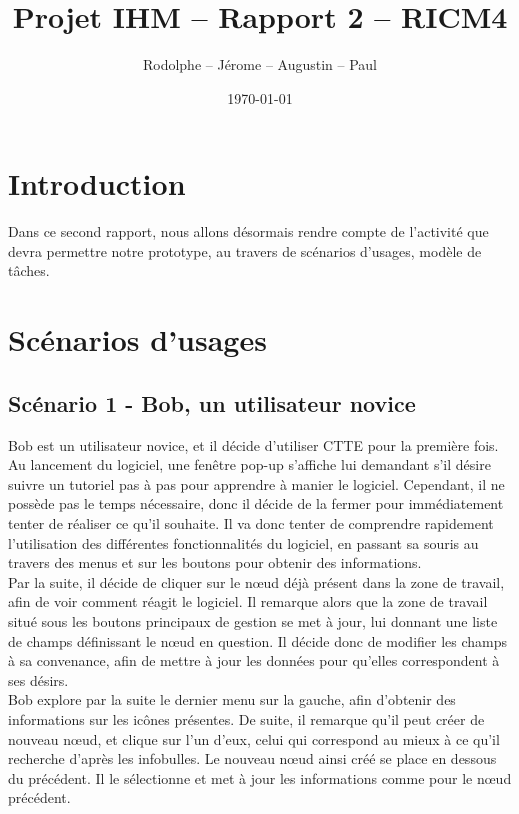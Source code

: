 \documentclass[12pt, a4paper]{article}
\title{Projet IHM -- Rapport 2 -- RICM4}
\author{\bsc{Fréby} Rodolphe -- \bsc{Barbier} Jérome -- \bsc{Husson} Augustin -- \bsc{Labat} Paul}
\date{\today}
\begin{document}
\maketitle
\tableofcontents
\newpage

\section{Introduction}
Dans ce second rapport, nous allons désormais rendre compte de l'activité que devra permettre notre prototype, au travers de scénarios d'usages, modèle de tâches.

\section{Scénarios d'usages}
\subsection{Scénario 1 - Bob, un utilisateur novice}


Bob est un utilisateur novice, et il décide d'utiliser CTTE pour la première fois. Au lancement du logiciel, une fenêtre pop-up s'affiche lui demandant s’il désire suivre un tutoriel pas à pas pour apprendre à manier le logiciel. Cependant, il ne possède pas le temps nécessaire, donc il décide de la fermer pour immédiatement tenter de réaliser ce qu'il souhaite. Il va donc tenter de comprendre rapidement l'utilisation des différentes fonctionnalités du logiciel, en passant sa souris au travers des menus et sur les boutons pour obtenir des informations.\\ 


Par la suite, il décide de cliquer sur le nœud déjà présent dans la zone de travail, afin de voir comment réagit le logiciel. Il remarque alors que la zone de travail situé sous les boutons principaux de gestion se met à jour, lui donnant une liste de champs définissant le nœud en question. Il décide donc de modifier les champs à sa convenance, afin de mettre à jour les données pour qu'elles correspondent à ses désirs.\\


Bob explore par la suite le dernier menu sur la gauche, afin d'obtenir des informations sur les icônes présentes. De suite, il remarque qu'il peut créer de nouveau nœud, et clique sur l'un d'eux, celui qui correspond au mieux à ce qu'il recherche d'après les infobulles. Le nouveau nœud ainsi créé se place en dessous du précédent. Il le sélectionne et met à jour les informations comme pour le nœud précédent. \\
\end{document}
